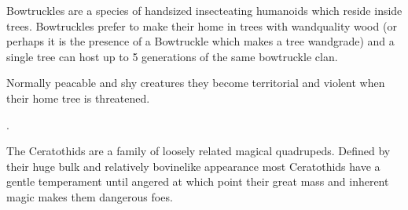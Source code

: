 {
	Bowtruckles are a species of hand\minus{}sized\comma{} insect\minus{}eating humanoids which reside inside trees. Bowtruckles prefer to make their home in trees with wand\minus{}quality wood (or perhaps\comma{} it is the presence of a Bowtruckle which makes a tree wand\minus{}grade)\comma{} and a single tree can host up to 5 generations of the same bowtruckle clan. 

Normally peacable and shy creatures\comma{} they become territorial and violent when their home tree is threatened. 


. 

}
{










}




{
	The Ceratothids are a family of loosely related magical quadrupeds. Defined by their huge bulk and relatively bovine\minus{}like appearance\comma{} most Ceratothid\apos{}s have a gentle temperament until angered\comma{} at which point their great mass and inherent magic makes them dangerous foes.
}
{










}








